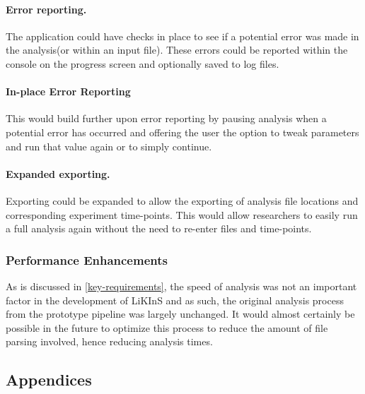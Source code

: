 \documentclass{l4proj}
\begin{document}
    \subsubsection{Error reporting.} The application could have checks in place to see if a potential error was made in the analysis(or within an input file). These errors could be reported within the console on the progress screen and optionally saved to log files.
    \subsubsection{In-place Error Reporting} This would build further upon error reporting by pausing analysis when a potential error has occurred and offering the user the option to tweak parameters and run that value again or to simply continue.
   \subsubsection{Expanded exporting.} Exporting could be expanded to allow the exporting of analysis file locations and corresponding experiment time-points. This would allow researchers to easily run a full analysis again without the need to re-enter files and time-points.

\subsection{Performance Enhancements}
As is discussed in \ref{key-requirements}, the speed of analysis was not an important factor in the development of LiKInS and as such, the original analysis process from the prototype pipeline was largely unchanged. It would almost certainly be possible in the future to optimize this process to reduce the amount of file parsing involved, hence reducing analysis times.

%
% 

\begin{appendices}

\chapter{Appendices}



\end{appendices}






\end{document}
